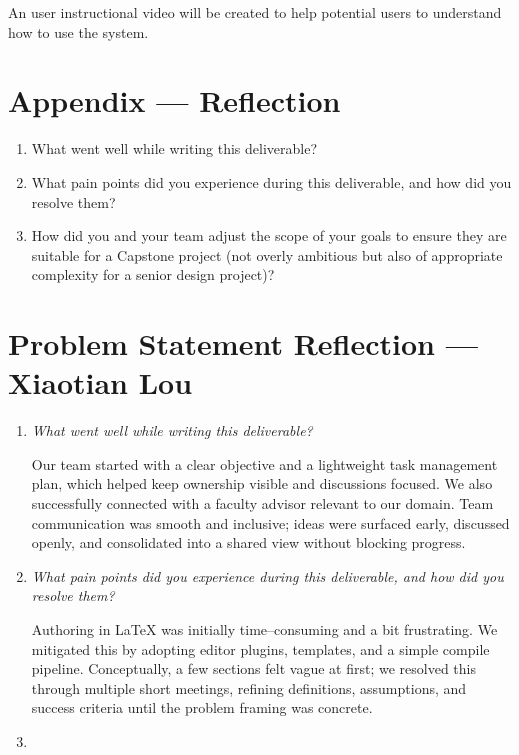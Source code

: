 \documentclass{article}
\begin{document}
An user instructional video will be created to help potential users to
understand how to use the system.

\newpage{}

\section*{Appendix --- Reflection}




\begin{enumerate}
    \item What went well while writing this deliverable?
    \item What pain points did you experience during this deliverable, and how did you
          resolve them?
    \item How did you and your team adjust the scope of your goals to ensure they are
          suitable for a Capstone project (not overly ambitious but also of appropriate
          complexity for a senior design project)?
\end{enumerate}
\section*{Problem Statement Reflection --- Xiaotian Lou}

\begin{enumerate}
  \item \textit{What went well while writing this deliverable?}

  Our team started with a clear objective and a lightweight task
  management plan, which helped keep ownership visible and discussions
  focused. We also successfully connected with a faculty advisor relevant
  to our domain. Team communication was smooth and inclusive; ideas were
  surfaced early, discussed openly, and consolidated into a shared view
  without blocking progress.

  \item \textit{What pain points did you experience during this deliverable, and how did you resolve them?}

  Authoring in \LaTeX{} was initially time--consuming and a bit
  frustrating. We mitigated this by adopting editor plugins, templates,
  and a simple compile pipeline. Conceptually, a few sections felt vague
  at first; we resolved this through multiple short meetings, refining
  definitions, assumptions, and success criteria until the problem
  framing was concrete.
    \item

\end{enumerate}



\end{document}
